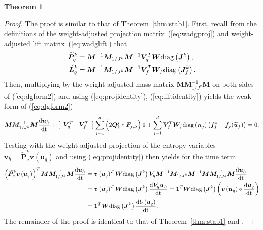 \documentclass[10pt]{amsart}
\theoremstyle{definition}
\theoremstyle{lemma}
\theoremstyle{theorem}
\newtheorem{theorem}{Theorem}
\theoremstyle{assumption}
\renewcommand{\tilde}{\widetilde}
\newcommand{\td}[2]{\frac{{\rm d}#1}{{\rm d}{\rm #2}}}
\newcommand{\LRp}[1]{\left( #1 \right)}
\newcommand{\LRs}[1]{\left[ #1 \right]}
\newcommand{\diag}[1]{{\rm diag}\LRp{#1}}
\begin{document}
{\begin{theorem}
\[\]
\label{thm:stab2}
\end{theorem}
\begin{proof}
The proof is similar to that of Theorem~\ref{thm:stab1}.  
First, recall from the definitions of the weight-adjusted projection matrix~(\ref{eq:wadgproj}) and weight-adjusted lift matrix~(\ref{eq:wadglift}) that
\begin{align}
\tilde{\bm{P}}^k_q &= \bm{M}^{-1}\bm{M}_{1/J^k} \bm{M}^{-1} \bm{V}_q^T \bm{W}  \diag{\bm{J}^k  }\label{eq:projidentity},\\
\tilde{\bm{L}}^k_q &= \bm{M}^{-1}\bm{M}_{1/J^k} \bm{M}^{-1} \bm{V}_f^T \bm{W}_f\diag{\bm{J}^k_f}\label{eq:liftidentity}.
\end{align}
Then, multiplying by the weight-adjusted mass matrix $\bm{M}\bm{M}_{1/J^k}^{-1}\bm{M}$ on both sides of (\ref{eq:dgform2}) and using (\ref{eq:projidentity}), (\ref{eq:liftidentity}) yields the weak form of (\ref{eq:dgform2})
\begin{equation}
\bm{M}\bm{M}_{1/J^k}^{-1}\bm{M}\td{\bm{u}_h}{t} + \LRs{\begin{array}{cc}{\bm{V}}_q^T & {\bm{V}}_f^T\end{array}}
\sum_{j=1}^d \LRp{2\bm{Q}^j_k \circ \bm{F}_{j,S}}\bm{1} + \sum_{j=1}^d {\bm{V}}_f^T\bm{W}_f \diag{\bm{n}_j}\LRp{\bm{f}_j^* - \bm{f}_j(\tilde{\bm{u}}_f)} = 0.
\label{eq:dgform2weak}
\end{equation}
Testing with the weight-adjusted projection of the entropy variables $\bm{v}_h = \tilde{\bm{P}}^k_q \bm{v}\LRp{\bm{u}_q}$ and using (\ref{eq:projidentity}) then yields for the time term
\begin{align*}
\LRp{\tilde{\bm{P}}^k_q \bm{v}\LRp{\bm{u}_q}}^T\bm{M}\bm{M}_{1/J^k}^{-1}\bm{M}\td{\bm{u}_h}{t} &= \bm{v}\LRp{\bm{u}_q}^T\bm{W}\diag{\bm{J}^k}\bm{V}_q \bm{M}^{-1}\bm{M}_{1/J^k} \bm{M}^{-1} \bm{M}\bm{M}_{1/J^k}^{-1}\bm{M}\td{\bm{u}_h}{t}\\
                                                                                               &= \bm{v}\LRp{\bm{u}_q}^T\bm{W}\diag{\bm{J}^k} \td{\bm{V}_q\bm{u}_h}{t} = \bm{1}^T\bm{W}\diag{\bm{J}^k} \left(\bm{v}\LRp{\bm{u}_q}\circ\td{\bm{u}_q}{t}\right) \\
                                                                                               &= \bm{1}^T\bm{W}\diag{\bm{J}^k} \td{U(\bm{u}_q)}{t}.
\end{align*}
The remainder of the proof is identical to that of Theorem~\ref{thm:stab1} and \cite{chan2017discretely}.
\end{proof}

}
\end{document}

